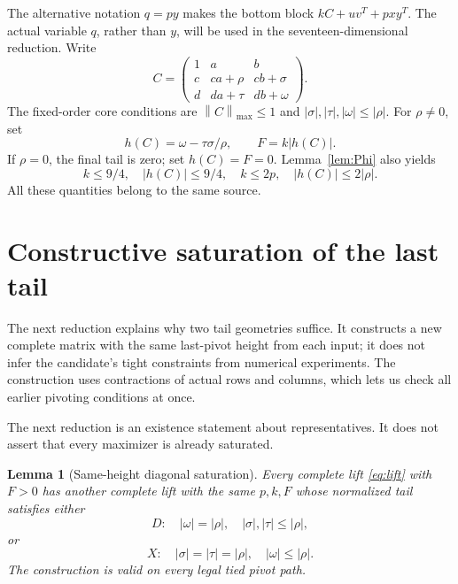 \documentclass[11pt,reqno]{amsart}
\newtheorem{lemma}[theorem]{Lemma}
\theoremstyle{definition}
\theoremstyle{remark}
\newcommand{\mx}[1]{\left\|#1\right\|_{\max}}
\begin{document}
The alternative notation \(q=py\) makes the bottom block
\(kC+uv^T+pxy^T\). The actual variable \(q\), rather than \(y\), will be
used in the seventeen-dimensional reduction.
Write
\begin{equation}\label{eq:core}
C=
\begin{pmatrix}
1&a&b\\
c&ca+\rho&cb+\sigma\\
d&da+\tau&db+\omega
\end{pmatrix}.
\end{equation}
The fixed-order core conditions are
\(\mx C\le1\) and \(|\sigma|,|\tau|,|\omega|\le|\rho|\).
For \(\rho\ne0\), set
\[
h(C)=\omega-\tau\sigma/\rho,\qquad F=k|h(C)|.
\]
If \(\rho=0\), the final tail is zero; set \(h(C)=F=0\).
Lemma~\ref{lem:Phi} also yields
\begin{equation}\label{eq:necessaryscalars}
k\le9/4,\quad |h(C)|\le9/4,\quad k\le2p,\quad
|h(C)|\le2|\rho|.
\end{equation}
All these quantities belong to the same source.

\section{Constructive saturation of the last tail}\label{sec:saturation}

The next reduction explains why two tail geometries suffice. It constructs
a new complete matrix with the same last-pivot height from each input;
it does not infer the candidate's tight constraints from numerical
experiments. The construction uses contractions of actual rows and
columns, which lets us check all earlier pivoting conditions at once.

The next reduction is an existence statement about representatives.
It does not assert that every maximizer is already saturated.

\begin{lemma}[Same-height diagonal saturation]\label{lem:saturation}
Every complete lift \eqref{eq:lift} with \(F>0\) has another complete
lift with the same \(p,k,F\) whose normalized tail satisfies either
\[
D:\quad |\omega|=|\rho|,\quad |\sigma|,|\tau|\le|\rho|,
\]
or
\[
X:\quad |\sigma|=|\tau|=|\rho|,\quad |\omega|\le|\rho|.
\]
The construction is valid on every legal tied pivot path.
\end{lemma}
\end{document}
